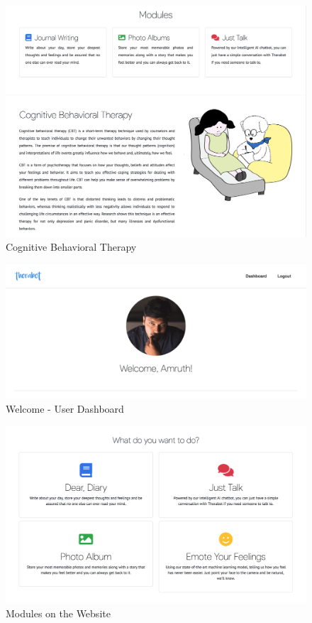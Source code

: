 \vspace*{\fill}
\begin{figure}[H]
    \centering
    \includegraphics[width=\textwidth]{images/screenshots/website/website-cbt.png}
    \caption{Cognitive Behavioral Therapy}
\end{figure}

\begin{figure}[H]
    \centering
    \includegraphics[width=\textwidth]{images/screenshots/website/website-welcome.png}
    \caption{Welcome - User Dashboard}
\end{figure}
\vspace*{\fill}

\pagebreak

\vspace*{\fill}
\begin{figure}[H]
    \centering
    \includegraphics[width=\textwidth]{images/screenshots/website/website-modules.png}
    \caption{Modules on the Website}
\end{figure}

